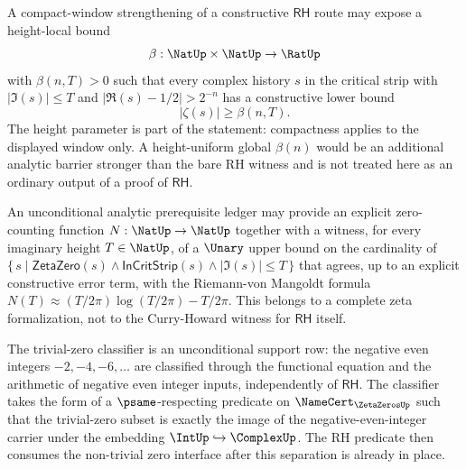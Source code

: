 \begin{theorem}
\label{thm:rh-witness-approach-rate}
A compact-window strengthening of a constructive $\mathsf{RH}$ route may expose a height-local bound
$$
\beta:\NatUp\times\NatUp\to\RatUp
$$
with $\beta(n,T)>0$ such that every complex history $s$ in the critical strip with $|\Im(s)|\le T$ and $|\Re(s)-1/2|>2^{-n}$ has a constructive lower bound
$$
|\zeta(s)|\ge \beta(n,T).
$$
The height parameter is part of the statement: compactness applies to the displayed window only. A height-uniform global $\beta(n)$ would be an additional analytic barrier stronger than the bare RH witness and is not treated here as an ordinary output of a proof of $\mathsf{RH}$.
\end{theorem}

\begin{theorem}
\label{thm:rh-witness-zero-count}
An unconditional analytic prerequisite ledger may provide an explicit zero-counting function $N : \NatUp \to \NatUp$ together with a witness, for every imaginary height $T \in \NatUp$, of a $\Unary$ upper bound on the cardinality of $\{\, s \mid \mathsf{ZetaZero}(s) \wedge \mathsf{InCritStrip}(s) \wedge |\Im(s)| \le T \,\}$ that agrees, up to an explicit constructive error term, with the Riemann-von Mangoldt formula $N(T) \approx (T / 2\pi) \log(T / 2\pi) - T / 2\pi$. This belongs to a complete zeta formalization, not to the Curry-Howard witness for $\mathsf{RH}$ itself.
\end{theorem}

\begin{theorem}
\label{thm:rh-witness-trivial-zero}
The trivial-zero classifier is an unconditional support row: the negative even integers $-2,-4,-6,\dots$ are classified through the functional equation and the arithmetic of negative even integer inputs, independently of $\mathsf{RH}$. The classifier takes the form of a $\psame$-respecting predicate on $\NameCert_{\ZetaZerosUp}$ such that the trivial-zero subset is exactly the image of the negative-even-integer carrier under the embedding $\IntUp \hookrightarrow \ComplexUp$. The RH predicate then consumes the non-trivial zero interface after this separation is already in place.
\end{theorem}

